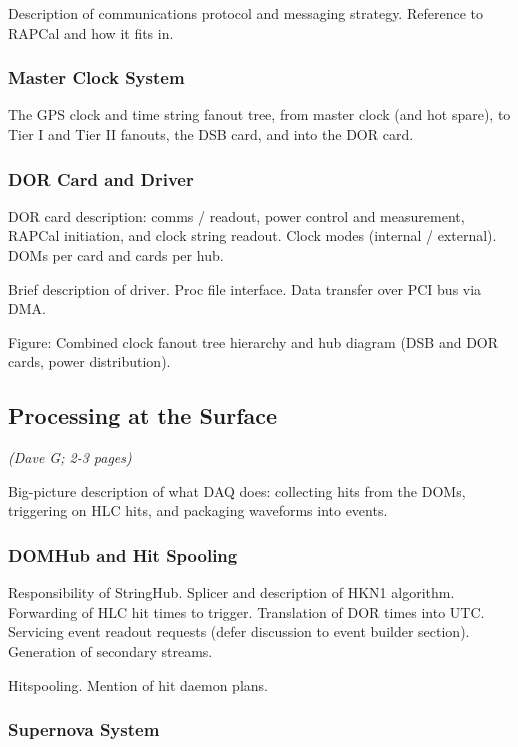 Description of communications protocol and messaging strategy.  Reference
to RAPCal and how it fits in.


\subsubsection{Master Clock System}

The GPS clock and time string fanout tree, from master clock (and hot
spare), to Tier I and Tier II fanouts, the DSB card, and into the DOR card.

\subsubsection{DOR Card and Driver}

DOR card description: comms / readout, power control and measurement,
RAPCal initiation, and clock string readout.  Clock modes (internal /
external).  DOMs per card and cards per hub.

Brief description of driver.  Proc file interface.  Data transfer over PCI
bus via DMA.  

Figure: Combined clock fanout tree hierarchy and hub diagram (DSB and DOR
cards, power distribution).

\subsection{Processing at the Surface}
\textsl{(Dave G; 2-3 pages)}

Big-picture description of what DAQ does: collecting hits from the DOMs,
triggering on HLC hits, and packaging waveforms into events.  

\subsubsection{DOMHub and Hit Spooling}

Responsibility of StringHub.  Splicer and description of HKN1 algorithm.
Forwarding of HLC hit times to trigger.  Translation of DOR times into
UTC.  Servicing event readout requests (defer discussion to event builder
section).  Generation of secondary streams. 

Hitspooling.  Mention of hit daemon plans.  

\subsubsection{Supernova System}

